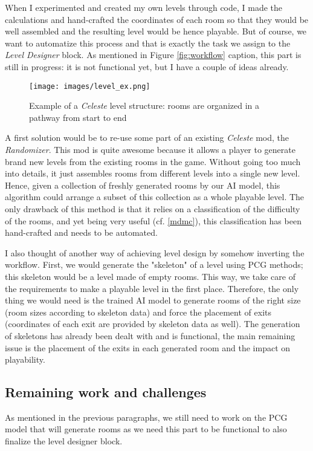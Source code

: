 \documentclass{article}
\newcommand{\Celeste}{\textit{Celeste} }
\begin{document}
\noindent When I experimented and created my own levels through code, I made the calculations and hand-crafted the coordinates of each room so that they would be well assembled and the resulting level would be hence playable. But of course, we want to automatize this process and that is exactly the task we assign to the \textit{Level Designer} block. As mentioned in Figure \ref{fig:workflow} caption, this part is still in progress: it is not functional yet, but I have a couple of ideas already.

\begin{figure}[h]
\centering
    \texttt{[image: images/level\_ex.png]}
    \caption{Example of a \Celeste level structure: rooms are organized in a pathway from start to end}
    \label{fig:lvl}
\end{figure}

\noindent A first solution would be to re-use some part of an existing \Celeste mod, the \textit{Randomizer}. This mod is quite awesome because it allows a player to generate brand new levels from the existing rooms in the game. Without going too much into details, it just assembles rooms from different levels into a single new level. Hence, given a collection of freshly generated rooms by our AI model, this algorithm could arrange a subset of this collection as a whole playable level. The only drawback of this method is that it relies on a classification of the difficulty of the rooms, and yet being very useful (cf. \ref{mdmc}), this classification has been hand-crafted and needs to be automated. 

\noindent I also thought of another way of achieving level design by somehow inverting the workflow. First, we would generate the "skeleton" of a level using PCG methods; this skeleton would be a level made of empty rooms. This way, we take care of the requirements to make a playable level in the first place. Therefore, the only thing we would need is the trained AI model to generate rooms of the right size (room sizes according to skeleton data) and force the placement of exits (coordinates of each exit are provided by skeleton data as well). The generation of skeletons has already been dealt with and is functional, the main remaining issue is the placement of the exits in each generated room and the impact on playability.

\subsection{Remaining work and challenges}
As mentioned in the previous paragraphs, we still need to work on the PCG model that will generate rooms as we need this part to be functional to also finalize the level designer block.
\end{document}
